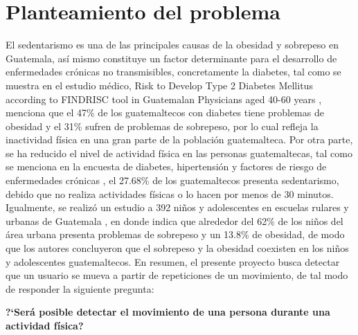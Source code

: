 \chapter{Planteamiento del problema}
El sedentarismo es una de las principales causas de la obesidad y sobrepeso en Guatemala, as\'i mismo constituye un factor determinante para el desarrollo de enfermedades cr\'onicas no transmisibles, concretamente la diabetes, tal como se muestra en el estudio m\'edico, Risk to Develop Type 2 Diabetes Mellitus according to FINDRISC tool in Guatemalan Physicians aged 40-60 years \cite{castro2017risk}, menciona que el 47\% de los guatemaltecos con diabetes tiene problemas de obesidad y el 31\%  sufren de problemas de sobrepeso, por lo cual refleja la inactividad f\'isica en una gran parte de la poblaci\'on guatemalteca.
\medbreak
Por otra parte, se ha reducido el nivel de actividad f\'isica en las personas guatemaltecas, tal como se menciona en la encuesta de diabetes, hipertensi\'on y factores de riesgo de enfermedades cr\'onicas \cite{orellana2006organizacion}, el 27.68\% de los guatemaltecos presenta sedentarismo, debido que no realiza actividades f\'isicas o lo hacen por menos de 30 minutos.
\medbreak
Igualmente, se realiz\'o un estudio a 392 ni\~nos y adolescentes en escuelas rulares y urbanas de Guatemala \cite{orellana2006organizacion}, en donde indica que alrededor del 62\% de los ni\~nos del  \'area urbana presenta problemas de sobrepeso y un 13.8\% de obesidad, de modo que los autores concluyeron que el sobrepeso y la obesidad coexisten en los ni\~nos y adolescentes guatemaltecos.
\medbreak
En resumen, el presente proyecto busca detectar que un usuario se mueva a partir de repeticiones de un movimiento, de tal modo de responder la siguiente pregunta:
\medbreak
\begin{center}
\textbf{?`Ser\'a posible detectar el movimiento de una persona durante una actividad f\'isica?}
\end{center}





